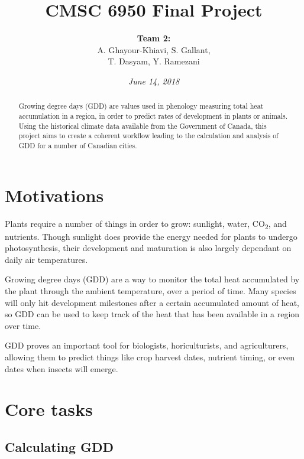 \documentclass[12pt]{article}
\title{CMSC 6950 Final Project}
\author{
        \textbf{Team 2:}\\
        A. Ghayour-Khiavi, S. Gallant,\\
        T. Dasyam, Y. Ramezani \\
        \and
}
\date{\textit{June 14, 2018}}
\begin{document}
\maketitle

\begin{abstract}
Growing degree days (GDD) are values used in phenology measuring total heat accumulation in a region, in order to predict rates of development in  plants or animals. Using the historical climate data available from the Government of Canada, this project aims to create a coherent workflow leading to the calculation and analysis of GDD for a number of Canadian cities.  
\end{abstract}

\smallskip

\tableofcontents


\pagebreak

\section{Motivations}\label{motivations}

Plants require a number of things in order to grow: sunlight, 
water, CO\textsubscript{2}, and nutrients. Though sunlight does provide the energy 
needed for plants to undergo photosynthesis, their development and maturation 
is also largely dependant on daily air temperatures.

\bigskip
\par 
Growing degree days (GDD) are a way to monitor the total heat 
accumulated by the plant through the ambient temperature, over a 
period of time. Many species will only hit development milestones 
after a certain accumulated amount of heat, so GDD can be used to 
keep track of the heat that has been available in a region over time. 

\bigskip
\par 
GDD proves an important tool for biologists, horiculturists, and agriculturers, 
allowing them to predict things like crop harvest dates, 
nutrient timing, or even dates when insects will emerge.    

\pagebreak


\section{Core tasks}\label{core tasks}
\subsection{Calculating GDD}\label{calculating gdd}
\end{document}
